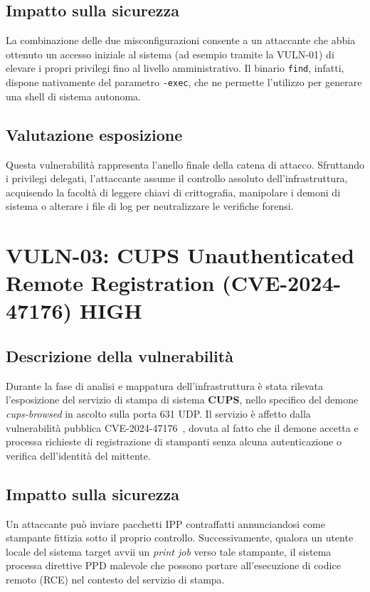 \documentclass[11pt]{report}
\newcommand{\sevHIGH}{\textcolor{sevElevato}{\textbf{HIGH}}}
\begin{document}
	\subsection{Impatto sulla sicurezza}
	La combinazione delle due misconfigurazioni consente a un attaccante che abbia ottenuto un accesso iniziale al sistema (ad esempio tramite la VULN-01) di elevare i propri privilegi fino al livello amministrativo. Il binario \texttt{find}, infatti, dispone nativamente del parametro \texttt{-exec}, che ne permette l'utilizzo per generare una shell di sistema autonoma.
	
	\subsection{Valutazione esposizione}
	Questa vulnerabilità rappresenta l'anello finale della catena di attacco. Sfruttando i privilegi delegati, l'attaccante assume il controllo assoluto dell'infrastruttura, acquisendo la facoltà di leggere chiavi di crittografia, manipolare i demoni di sistema o alterare i file di log per neutralizzare le verifiche forensi.
	
	\section[CUPS Vulnerability]{VULN-03: CUPS Unauthenticated Remote Registration (CVE-2024-47176) \hfill \sevHIGH}
	\subsection{Descrizione della vulnerabilità}
	Durante la fase di analisi e mappatura dell'infrastruttura è stata rilevata l'esposizione del servizio di stampa di sistema \textbf{CUPS}, nello specifico del demone \textit{cups-browsed} in ascolto sulla porta 631 UDP. Il servizio è affetto dalla vulnerabilità pubblica CVE-2024-47176~\cite{cve-cups}, dovuta al fatto che il demone accetta e processa richieste di registrazione di stampanti senza alcuna autenticazione o verifica dell'identità del mittente.
	
	\subsection{Impatto sulla sicurezza}
	Un attaccante può inviare pacchetti IPP contraffatti annunciandosi come stampante fittizia sotto il proprio controllo. Successivamente, qualora un utente locale del sistema target avvii un \textit{print job} verso tale stampante, il sistema processa direttive PPD malevole che possono portare all'esecuzione di codice remoto (RCE) nel contesto del servizio di stampa.
	
\end{document}
